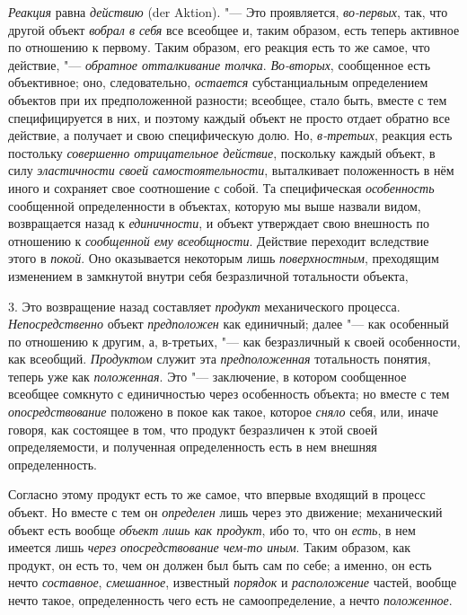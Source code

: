 {\em Реакция} равна
{\em действию} (der Aktion). "---
Это проявляется,
{\em во-первых},
так, что другой объект
{\em вобрал в себя} все
всеобщее и, таким образом, есть теперь активное по отношению к первому.
Таким образом, его реакция есть то же самое, что действие, "---
{\em обратное отталкивание толчка}.
{\em Во-вторых},
сообщенное есть объективное; оно, следовательно,
{\em остается}
субстанциальным определением объектов при их предположенной
разности; всеобщее, стало быть, вместе с тем специфицируется в них, и
поэтому каждый объект не просто отдает обратно все действие, а получает и
свою специфическую долю. Но,
{\em в-третьих}, реакция
есть постольку {\em совершенно
отрицательное действие}, поскольку каждый объект, в силу
{\em эластичности своей
самостоятельности}, выталкивает положенность в нём иного и
сохраняет свое соотношение с собой. Та специфическая
{\em особенность}
сообщенной определенности в объектах, которую мы выше назвали
видом, возвращается назад к
{\em единичности}, и
объект утверждает свою внешность по отношению к
{\em сообщенной ему всеобщности}.
Действие переходит вследствие этого в
{\em покой}. Оно
оказывается некоторым лишь
{\em поверхностным},
преходящим изменением в замкнутой внутри себя безразличной
тотальности объекта,

3. Это возвращение назад составляет
{\em продукт}
механического процесса.
{\em Непосредственно}
объект {\em предположен}
как единичный; далее "--- как
особенный по отношению к другим, а, в-третьих, "--- как
безразличный к своей особенности, как всеобщий.
{\em Продуктом} служит
эта {\em предположенная}
тотальность понятия, теперь уже как
{\em положенная}. Это
"--- заключение,
в котором сообщенное всеобщее сомкнуто с единичностью через
особенность объекта; но вместе с тем
{\em опосредствование}
положено в покое как такое, которое
{\em сняло} себя, или,
иначе говоря, как состоящее в том, что продукт безразличен к этой своей
определяемости, и полученная определенность есть в нем внешняя
определенность.

Согласно этому продукт есть то же самое, что впервые входящий
в процесс объект. Но вместе с тем он
{\em определен} лишь
через это движение; механический объект есть вообще
{\em объект лишь как продукт},
ибо то, что он
{\em есть}, в нем имеется
лишь {\em через опосредствование
чем-то иным}. Таким образом, как продукт, он есть то,
чем он должен был быть сам по себе; а именно, он есть нечто
{\em составное},
{\em смешанное}, известный
{\em порядок} и
{\em расположение}
частей, вообще нечто такое, определенность чего есть не
самоопределение, а нечто
{\em положенное}.


